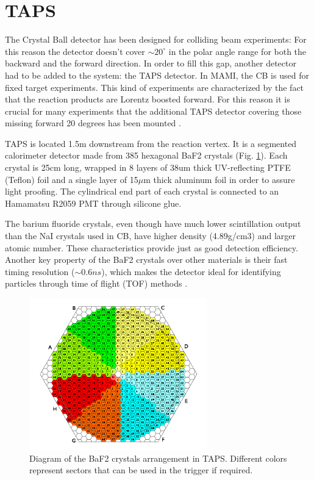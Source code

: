 \section{TAPS}

\indent The Crystal Ball detector has been designed for colliding beam experiments: For this reason the detector  doesn't  cover  $\sim 20^{\circ}$ in the polar  angle  range  for both the  backward  and  the forward direction. In order to fill this gap,  another detector had to be added to the system: the TAPS detector. In MAMI,  the  CB  is  used  for fixed  target  experiments. This kind of experiments are characterized by the fact that the reaction products are Lorentz boosted forward. For this reason it is crucial for many experiments that the additional TAPS detector  covering  those  missing  forward  20  degrees has  been  mounted \cite{novotny}.

\indent TAPS is located 1.5m downstream from the reaction vertex. It is a segmented calorimeter detector made from 385 hexagonal BaF2 crystals (Fig. \ref{taps}). Each crystal is  25cm long,  wrapped in  8  layers  of 38um thick  UV-reflecting PTFE (Teflon) foil and a single layer of 15$\mu$m thick aluminum foil in order to assure light proofing. The cylindrical end part of each crystal is connected to an Hamamatsu R2059 PMT through silicone glue.

\indent The barium fluoride crystals, even though have much lower scintillation output than the NaI crystals used in CB, have higher density (4.89g/cm3) and larger atomic number. These characteristics provide just as good detection efficiency. Another key property of the BaF2 crystals over other materials is their fast timing resolution ($\sim 0.6ns$), which makes the detector ideal for identifying particles through time of flight (TOF) methods \cite{novotny}.


\begin{figure}[H]
\begin{center}
\includegraphics[scale=1.5]{pictures/png/taps.png}
\caption{Diagram of the BaF2 crystals arrangement in TAPS. Different colors represent sectors that can be used in the trigger if required.}
\label{taps}
\end{center}
\end{figure} 

